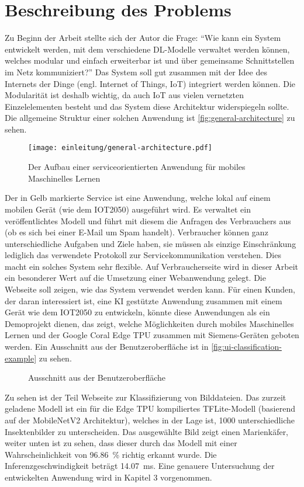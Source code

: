 \section{Beschreibung des Problems}
Zu Beginn der Arbeit stellte sich der Autor die Frage:
\enquote{Wie kann ein System entwickelt werden, mit dem verschiedene DL-Modelle
  verwaltet werden können, welches modular und einfach erweiterbar ist
  und über gemeinsame Schnittstellen im Netz kommuniziert?}
Das System soll gut zusammen mit der Idee des Internets der Dinge
(engl. Internet of Things, IoT) integriert werden können.
Die Modularität ist deshalb wichtig, da auch IoT aus vielen vernetzten
Einzelelementen besteht und das System diese Architektur widerspiegeln sollte.
Die allgemeine Struktur einer solchen Anwendung ist \autoref{fig:general-architecture} zu
sehen. 
\begin{figure}[h!]
  \centering
  \texttt{[image: einleitung/general-architecture.pdf]}
  \caption{Der Aufbau einer serviceorientierten Anwendung für mobiles Maschinelles Lernen}
  \label{fig:general-architecture}
\end{figure}

\noindent
Der in Gelb markierte Service ist eine Anwendung, welche
lokal auf einem mobilen Gerät (wie dem IOT2050) ausgeführt wird.
Es verwaltet ein veröffentlichtes Modell und führt mit diesem
die Anfragen des Verbrauchers aus (\zB ob es sich bei einer E-Mail um Spam handelt).
Verbraucher können ganz unterschiedliche Aufgaben und Ziele haben, sie müssen
als einzige Einschränkung lediglich das verwendete Protokoll
zur Servicekommunikation verstehen.
Dies macht ein solches System sehr flexible.
Auf Verbraucherseite wird in dieser Arbeit
ein besonderer Wert auf die Umsetzung einer Webanwendung gelegt.
Die Webseite soll zeigen, wie das System verwendet
werden kann. Für einen Kunden, der daran interessiert ist, eine
KI gestützte Anwendung zusammen mit einem Gerät wie dem IOT2050
zu entwickeln, könnte diese Anwendungen als ein Demoprojekt dienen,
das zeigt, welche Möglichkeiten durch mobiles
Maschinelles Lernen und der Google Coral Edge TPU zusammen mit Siemens-Geräten
geboten werden.
Ein Ausschnitt aus der Benutzeroberfläche ist in
\autoref{fig:ui-classification-example} zu sehen.
\newpage
\begin{figure}[h!]
  \centering
  \caption{Ausschnitt aus der Benutzeroberfläche}
  \label{fig:ui-classification-example}
\end{figure}
\noindent
Zu sehen ist der Teil Webseite zur Klassifizierung von Bilddateien.
Das zurzeit geladene Modell ist ein für die Edge TPU kompiliertes
TFLite-Modell (basierend auf der MobileNetV2 Architektur),
welches in der Lage ist, 1000 unterschiedliche
Insektenbilder zu unterscheiden. Das ausgewählte Bild zeigt
einen Marienkäfer, weiter unten ist zu sehen, dass dieser durch das Modell mit
einer Wahrscheinlichkeit von \qty{96.86}{\percent} richtig erkannt wurde.
Die Inferenzgeschwindigkeit beträgt \qty{14.07}{\milli\second}.
Eine genauere Untersuchung der entwickelten Anwendung wird
in Kapitel 3 vorgenommen.